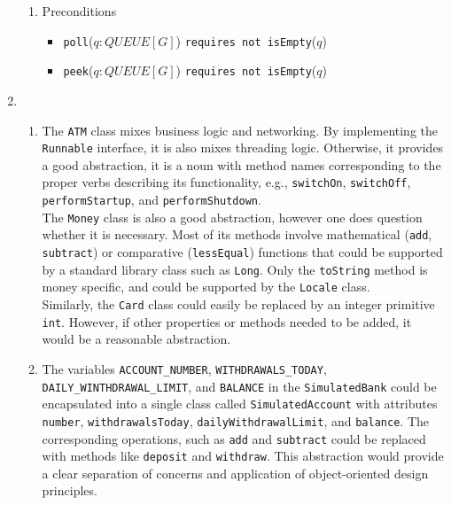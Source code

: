 \documentclass{report}
\begin{document}
\begin{enumerate}
\begin{enumerate}
		\item Preconditions		
		\begin{itemize}
			\item \texttt{poll}($q: QUEUE[G]$) \texttt{requires not isEmpty}($q$)
            \item \texttt{peek}($q: QUEUE[G]$) \texttt{requires not isEmpty}($q$)
		\end{itemize}
	\end{enumerate}

	\item 	
	\begin{enumerate}
		\item 
		The \texttt{ATM} class mixes business logic and networking. By implementing the \texttt{Runnable} interface, it is also mixes threading logic. Otherwise, 
		it provides a good abstraction, it is a noun with method names corresponding
		to the proper verbs describing its functionality, e.g., \texttt{switchOn},
		\texttt{switchOff}, \texttt{performStartup}, and \texttt{performShutdown}. \\
		
		The \texttt{Money} class is also a good abstraction, however one does question
		whether it is necessary. Most of its methods involve mathematical
    	(\texttt{add}, \texttt{subtract}) or comparative (\texttt{lessEqual})
    	functions that could be supported by a standard library class such as \texttt{Long}. Only the \texttt{toString} method is money specific,
    	and could be supported by the \texttt{Locale} class. \\
    	
    	Similarly, the \texttt{Card} class could easily be replaced by an
    	integer primitive \texttt{int}. However, if other properties or methods
    	needed to be added, it would be a reasonable abstraction.
		
		\item The variables \texttt{ACCOUNT\_NUMBER}, \texttt{WITHDRAWALS\_TODAY}, \\ \texttt{DAILY\_WINTHDRAWAL\_LIMIT},
		and \texttt{BALANCE}
		in the \texttt{SimulatedBank} could be encapsulated into
		a single class called \texttt{SimulatedAccount} with
		attributes \texttt{number}, \texttt{withdrawalsToday},
		\texttt{dailyWithdrawalLimit}, and \texttt{balance}.
        The corresponding operations, such as \texttt{add} and
        \texttt{subtract} could be replaced with methods like
        \texttt{deposit} and \texttt{withdraw}. This abstraction
        would provide a clear separation of concerns and 
        application of object-oriented design principles.
	\end{enumerate}


\end{enumerate}
\end{document}
